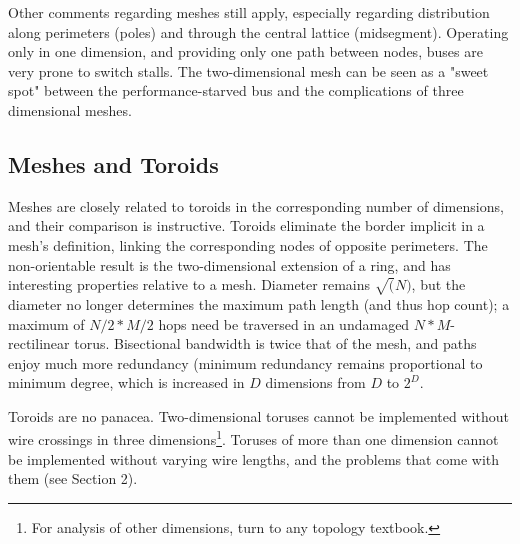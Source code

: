 \documentclass[twocolumn]{article}
\begin{document}
Other comments regarding meshes still apply, especially regarding distribution
along perimeters (poles) and through the central lattice (midsegment). Operating
only in one dimension, and providing only one path between nodes, buses are
very prone to switch stalls. The two-dimensional mesh can be seen as a "sweet
spot" between the performance-starved bus and the complications of three
dimensional meshes.
\subsection{Meshes and Toroids}
Meshes are closely related to toroids in the corresponding number of dimensions,
and their comparison is instructive. Toroids eliminate the border implicit in a
mesh's definition, linking the corresponding nodes of opposite perimeters. The
non-orientable result is the two-dimensional extension of a ring, and has
interesting properties relative to a mesh. Diameter remains $\sqrt(N)$, but the
diameter no longer determines the maximum path length (and thus hop count); a
maximum of $N/2*M/2$ hops need be traversed in an undamaged $N*M$-rectilinear
torus. Bisectional bandwidth is twice that of the mesh, and paths enjoy much
more redundancy (minimum redundancy remains proportional to minimum degree,
which is increased in $D$ dimensions from $D$ to $2^D$.

Toroids are no panacea. Two-dimensional toruses cannot be implemented without
wire crossings in three dimensions\footnote{For analysis of other dimensions,
turn to any topology textbook.}. Toruses of more than one dimension cannot be implemented
without varying wire lengths, and the problems that come with them (see Section 2).
\end{document}
